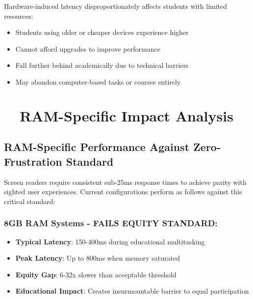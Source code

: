 Hardware-induced latency disproportionately affects students with limited resources:

\begin{itemize}
	\item Students using older or cheaper devices experience higher  \supercite{Attewell2001TheDigitalDivide}
	\item Cannot afford  upgrades to improve performance \supercite{Warschauer2003TechnologyAndSocialInclusion}
	\item Fall further behind academically due to technical barriers \supercite{DiMaggio2001FromUnequalAccess}
	\item May abandon computer-based tasks or courses entirely \supercite{Compaine2001TheDigitalDivide}
\end{itemize}

\section{~~RAM-Specific Impact Analysis}\label{ram-specific-impact-analysis}

\subsection{RAM-Specific Performance Against Zero-Frustration Standard}\label{ram-specific-performance-against-zero-frustration-standard}

Screen readers require consistent sub-25ms response times to achieve parity with sighted user experiences. Current  configurations perform as follows against this critical standard:

\subsubsection{8GB RAM Systems - FAILS EQUITY STANDARD:}

\begin{itemize}
	\item \textbf{Typical Latency}: 150-400ms during educational multitasking
	\item \textbf{Peak Latency}: Up to 800ms when memory saturated
	\item \textbf{Equity Gap}: 6-32x slower than acceptable threshold \supercite{EquityAnalysisRevision}
	\item \textbf{Educational Impact}: Creates insurmountable barrier to equal participation \supercite{EducationalEquityReport2024}
\end{itemize}


